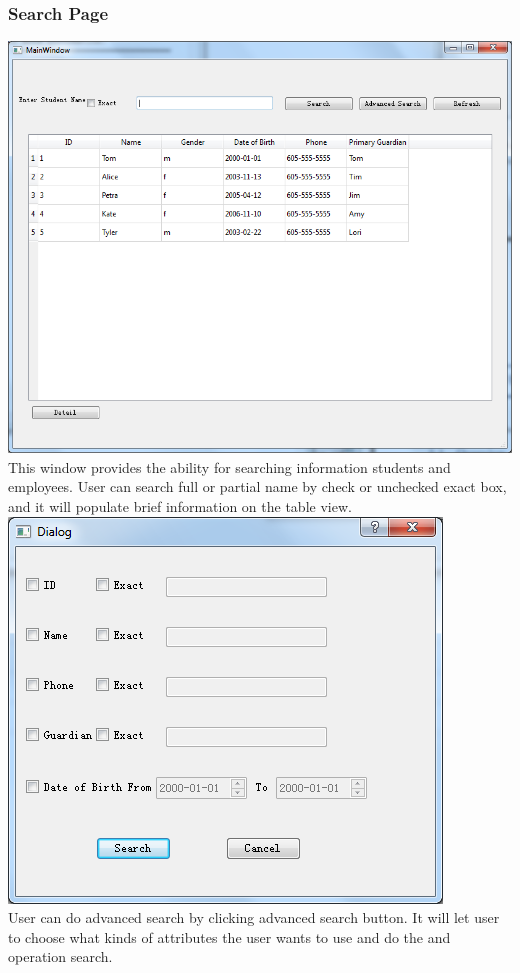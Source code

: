 \subsubsection{Search Page}
\includegraphics[scale=0.5]{pics/search.png}\\
This window provides the ability for searching information students and employees. User can search full or partial name by check or unchecked exact box, and it will populate brief information on the table view.
\includegraphics[scale=0.5]{pics/adv_search.png}\\
User can do advanced search by clicking advanced search button. It will let user to choose what kinds of attributes the user wants to use and do the and operation search.\\

